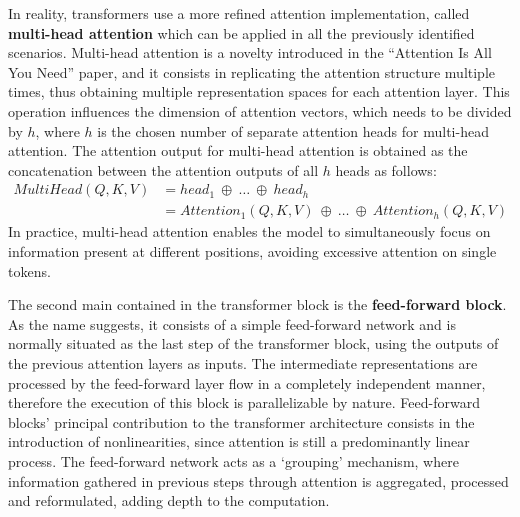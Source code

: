 In reality, transformers use a more refined attention implementation, called \textbf{multi-head attention} which can be applied in all the previously identified scenarios.
Multi-head attention is a novelty introduced in the ``Attention Is All You Need'' \cite{vaswani2017} paper, and it consists in replicating the attention structure multiple times, thus obtaining multiple representation spaces for each attention layer.
This operation influences the dimension of attention vectors, which needs to be divided by $h$, where $h$ is the chosen number of separate attention heads for multi-head attention.
The attention output for multi-head attention is obtained as the concatenation between the attention outputs of all $h$ heads as follows:
\begin{equation}
    \label{eq:background_multihead-attention}
    \begin{aligned}
    MultiHead(Q,K,V)    &= head_1\ \oplus\ \ldots\ \oplus\ head_h \\
                        &= Attention_1(Q,K,V)\ \oplus\ \ldots\ \oplus\ Attention_h(Q,K,V)
    \end{aligned}
\end{equation}
In practice, multi-head attention enables the model to simultaneously focus on information present at different positions, avoiding excessive attention on single tokens.


The second main  contained in the transformer block is the \textbf{feed-forward block}.
As the name suggests, it consists of a simple feed-forward network and is normally situated as the last step of the transformer block, using the outputs of the previous attention layers as inputs.
The intermediate representations are processed by the feed-forward layer flow in a completely independent manner, therefore the execution of this block is parallelizable by nature.
Feed-forward blocks' principal contribution to the transformer architecture consists in the introduction of nonlinearities, since attention is still a predominantly linear process.
The feed-forward network acts as a `grouping' mechanism, where information gathered in previous steps through attention is aggregated, processed and reformulated, adding depth to the computation.

